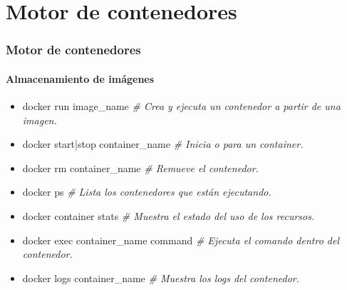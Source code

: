 \documentclass{beamer}
\begin{document}
\section{Motor de contenedores}
    \begin{frame}
    \frametitle{Motor de contenedores}
    \framesubtitle{Almacenamiento de imágenes}

        \begin{block}{}
        \begin{itemize}
            \item docker run \<image\_name\> \textit{\# Crea y ejecuta un contenedor a partir de una imagen.}
            \item docker start|stop \<container\_name\> \textit{\# Inicia o para un container.}
            \item docker rm \<container\_name\> \textit{\# Remueve el contenedor.}
            \item docker ps \textit{\# Lista los contenedores que están ejecutando.}
            \item docker container stats \textit{\# Muestra el estado del uso de los recursos.}
            \item docker exec \<container\_name\> \<command\> \textit{\# Ejecuta el comando dentro del contenedor.}
            \item docker logs \<container\_name\> \textit{\# Muestra los logs del contenedor.}
        \end{itemize}
        \end{block}
        
    \end{frame}
\end{document}

